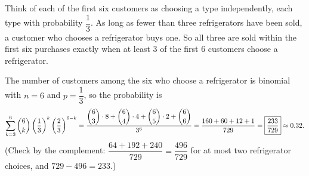 Think of each of the first six customers as choosing a type independently, each type with probability $\dfrac{1}{3}$. As long as fewer than three refrigerators have been sold, a customer who chooses a refrigerator buys one. So all three are sold within the first six purchases exactly when at least $3$ of the first $6$ customers choose a refrigerator.

The number of customers among the six who choose a refrigerator is binomial with $n=6$ and $p=\dfrac{1}{3}$, so the probability is
\[\sum_{k=3}^{6}\dbinom6k\left(\dfrac{1}{3}\right)^k\left(\dfrac{2}{3}\right)^{6-k}=\dfrac{\dbinom63\cdot8+\dbinom64\cdot4+\dbinom65\cdot2+\dbinom66}{3^6}=\dfrac{160+60+12+1}{729}=\boxed{\dfrac{233}{729}}\approx0.32 .\]
(Check by the complement: $\dfrac{64+192+240}{729}=\dfrac{496}{729}$ for at most two refrigerator choices, and $729-496=233$.)
